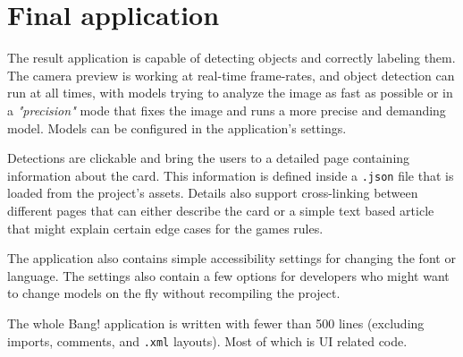 
\section{Final application}
The result application is capable of detecting objects and correctly labeling them. The camera preview is working at real-time frame-rates, and object detection can run at all times, with models trying to analyze the image as fast as possible or in a \textit{"precision"} mode that fixes the image and runs a more precise and demanding model. Models can be configured in the application's settings.

Detections are clickable and bring the users to a detailed page containing information about the card. This information is defined inside a \texttt{.json} file that is loaded from the project's assets. Details also support cross-linking between different pages that can either describe the card or a simple text based article that might explain certain edge cases for the games rules.

The application also contains simple accessibility settings for changing the font or language. The settings also contain a few options for developers who might want to change models on the fly without recompiling the project.

The whole Bang! application is written with fewer than 500 lines (excluding imports, comments, and \texttt{.xml} layouts). Most of which is UI related code.